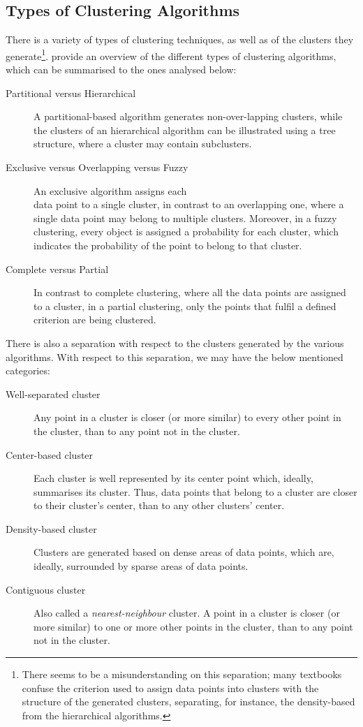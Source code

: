 \subsection{Types of Clustering Algorithms}
\label{subsec:clustering-types}

There is a variety of types of clustering techniques, as well as of the clusters they generate\footnote{There seems to be a misunderstanding on this separation; many textbooks confuse the criterion used to assign data points into clusters with the structure of the generated clusters, separating, for instance, the density-based from the hierarchical algorithms.}.  \cite{Pang:2006} provide an overview of the different types of clustering algorithms, which can be summarised to the ones analysed below:

\begin{description}
\item[Partitional versus Hierarchical] A partitional-based algorithm generates non-over-lapping clusters, while the clusters of an hierarchical algorithm can be illustrated using a tree structure, where a cluster may contain subclusters. 
\item[Exclusive versus Overlapping versus Fuzzy] An exclusive algorithm assigns each\\data point to a single cluster, in contrast to an overlapping one, where a single data point may belong to multiple clusters. Moreover, in a fuzzy clustering, every object is assigned a probability for each cluster, which indicates the probability of the point to belong to that cluster.
\item[Complete versus Partial] In contrast to complete clustering, where all the data points are assigned to a cluster, in a partial clustering, only the points that fulfil a defined criterion are being clustered.
\end{description}

There is also a separation with respect to the clusters generated by the various algorithms. With respect to this separation, we may have the below mentioned categories:

\begin{description}
\item[Well-separated cluster] Any point in a cluster is closer (or more similar) to every other point in the cluster, than to any point not in the cluster.
\item[Center-based cluster] Each cluster is well represented by its center point which, ideally, summarises its cluster. Thus, data points that belong to a cluster are closer to their cluster's center, than to any other clusters' center.
\item[Density-based cluster] Clusters are generated based on dense areas of data points, which are, ideally, surrounded by sparse areas of data points.
\item[Contiguous cluster] Also called a \textit{nearest-neighbour} cluster. A point in a cluster is closer (or more similar) to one or more other points in the cluster, than to any point not in the cluster.
\end{description}


